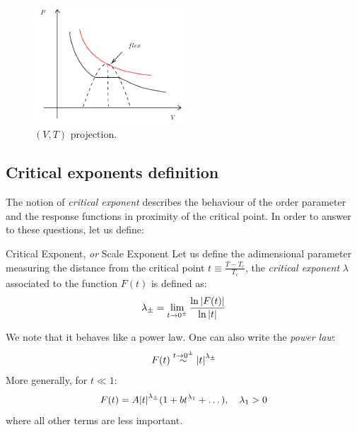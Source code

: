 \documentclass[../../Main/Main.tex]{subfiles}
\begin{document}
\begin{figure}[h!]
\centering
\includegraphics[width=0.5\textwidth]{./img/4__2.pdf}
\caption{\label{fig:3_2_2} \( (V,T) \) projection.  }
\end{figure}


\subsection{Critical exponents definition}

The notion of \emph{critical exponent} describes the behaviour of the order parameter and the response functions in proximity of the critical point.
In order to answer to these questions, let us define:


\begin{definition}{Critical Exponent, \emph{or} Scale Exponent}{}
Let us define the adimensional parameter measuring the distance from the critical point \( t \equiv \frac{T-T_c}{T_c} \), the \emph{critical exponent} \( \lambda  \) associated to the function \( F(t) \) is defined as:
\begin{equation}
  \lambda _{\pm} = \lim_{t \rightarrow 0^{\pm}} \frac{\ln{\abs{F(t)} } }{\ln{\abs{t} } }
\end{equation}
\end{definition}

We note that it behaves like a power law. One can also write the \textit{power law}:
\begin{equation}
  F(t) \overset{t \rightarrow  0^{\pm}}{\sim } \abs{t}^{\lambda _{\pm}}
\end{equation}
More generally, for \( t \ll 1 \):
\begin{equation}
  F(t) = A \abs{t}^{\lambda _{\pm}} ( 1 + bt^{\lambda _1}+ \dots), \quad \lambda _1 > 0
\end{equation}
where all other terms are less important.
\end{document}
